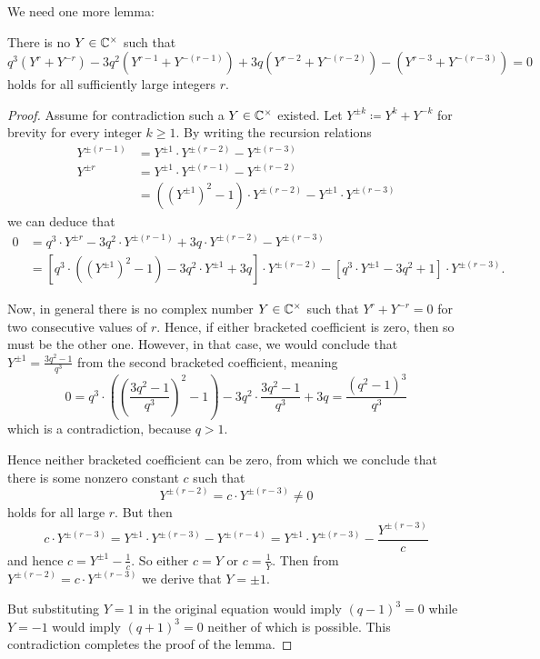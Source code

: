 We need one more lemma:
\begin{lemma}
  \label{lem:chebyshev}
  There is no $Y \in \mathbb C^\times$ such that
  \[ q^3(Y^r + Y^{-r}) - 3q^2(Y^{r-1} + Y^{-(r-1)})
    + 3q(Y^{r-2} + Y^{-(r-2)}) - (Y^{r-3} + Y^{-(r-3)}) = 0 \]
  holds for all sufficiently large integers $r$.
\end{lemma}
\begin{proof}
  Assume for contradiction such a $Y \in \mathbb C^\times$ existed.
  Let $Y^{\pm k} \coloneqq Y^k + Y^{-k}$ for brevity for every integer $k \ge 1$.
  By writing the recursion relations
  \begin{align*}
    Y^{\pm (r-1)} &= Y^{\pm 1} \cdot Y^{\pm (r-2)} - Y^{\pm (r-3)} \\
    Y^{\pm r} &= Y^{\pm 1} \cdot Y^{\pm (r-1)} - Y^{\pm (r-2)} \\
    &= ((Y^{\pm 1})^2 - 1) \cdot Y^{\pm (r-2)} - Y^{\pm 1} \cdot Y^{\pm (r-3)}
  \end{align*}
  we can deduce that
  \begin{align*}
    0 &= q^3 \cdot Y^{\pm r} - 3q^2 \cdot Y^{\pm (r-1)} + 3q \cdot Y^{\pm (r-2)} - Y^{\pm (r-3)} \\
    &= \left[ q^3 \cdot \left( (Y^{\pm 1})^2 - 1 \right)
      - 3q^2 \cdot Y^{\pm 1} + 3q \right] \cdot Y^{\pm (r-2)}
    - \left[ q^3 \cdot Y^{\pm 1} - 3q^2 + 1 \right] \cdot Y^{\pm (r-3)}.
  \end{align*}

  Now, in general there is no complex number $Y \in \mathbb C^\times$ such that
  $Y^r + Y^{-r} = 0$ for two consecutive values of $r$.
  Hence, if either bracketed coefficient is zero, then so must be the other one.
  However, in that case, we would conclude that
  $Y^{\pm 1} = \frac{3q^2-1}{q^3}$ from the second bracketed coefficient, meaning
  \[ 0 = q^3 \cdot \left( \left( \frac{3q^2-1}{q^3} \right)^2 - 1 \right)
    - 3q^2 \cdot \frac{3q^2-1}{q^3} + 3q = \frac{(q^2-1)^3}{q^3} \]
  which is a contradiction, because $q > 1$.

  Hence neither bracketed coefficient can be zero,
  from which we conclude that there is some nonzero constant $c$ such that
  \[ Y^{\pm (r-2)} = c \cdot Y^{\pm(r-3)} \neq 0 \]
  holds for all large $r$.
  But then
  \[ c \cdot Y^{\pm(r-3)}
    = Y^{\pm 1} \cdot Y^{\pm (r-3)} - Y^{\pm (r-4)}
    = Y^{\pm 1} \cdot Y^{\pm (r-3)} - \frac{Y^{\pm (r-3)}}{c} \]
  and hence $c = Y^{\pm 1} - \frac 1c$.
  So either $c = Y$ or $c = \frac 1Y$.
  Then from $Y^{\pm (r-2)} = c \cdot Y^{\pm(r-3)}$ we derive that $Y = \pm 1$.

  But substituting $Y = 1$ in the original equation would imply $(q-1)^3 = 0$
  while $Y = -1$ would imply $(q+1)^3 = 0$ neither of which is possible.
  This contradiction completes the proof of the lemma.
\end{proof}

